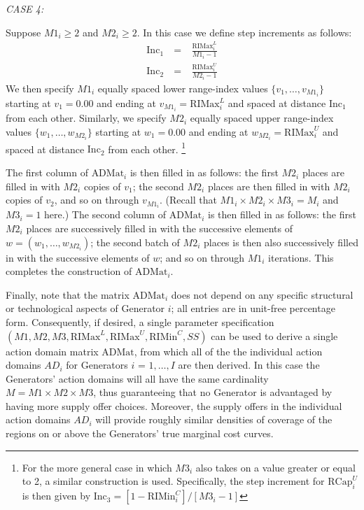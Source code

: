 \documentclass[12pt]{article}
\begin{document}
\vspace*{3mm}
\noindent
\textit{CASE 4:\/}

\nopagebreak
Suppose $M1_i \ge 2$ and $M2_i \ge 2$.  In this case we define step increments as follows:
           \begin{eqnarray} \label{StepInc}
        \mbox{Inc}_1 ~ &= &~  \frac{\mbox{RIMax}^L_i}{M1_i - 1} \\
        \mbox{Inc}_2 ~ &= & ~  \frac{\mbox{RIMax}^U_i}{M2_i - 1} 
                 \end{eqnarray}
We then specify $M1_i$ equally spaced lower range-index values $\{v_1,\ldots ,v_{M1_i}\}$ starting at $v_1 = 0.00$ and 
ending at $v_{M1_i} =\mbox{RIMax}^L_i$ and spaced at distance $\mbox{Inc}_1$ from each other.  Similarly, 
we specify $M2_i$ equally spaced upper range-index values  $\{w_1,\ldots ,w_{M2_i}\}$ starting at $w_1 = 0.00$ and 
ending at $w_{M2_i} =\mbox{RIMax}^U_i$ and spaced at distance $\mbox{Inc}_2$ from each other.%
	\footnote{For the more general case in which $M3_i$ also takes on a value greater or equal to 2, a similar construction is used.  Specifically, the step increment for $\mbox{RCap}_i^U$ is then given by $\mbox{Inc}_3 = [1 - \mbox{RIMin}_i^C]/[M3_i - 1]$} 

The first column of $\mbox{ADMat}_i$ is then filled in as follows:  the first $M2_i$ places are filled in with $M2_i$ copies of $v_1$; the second $M2_i$ places are then filled in with $M2_i$ copies of $v_2$, and so on through $v_{M1_i}$.  (Recall that $M1_i\times M2_i \times M3_i= M_i$ and $M3_i = 1$ here.) The second column of $\mbox{ADMat}_i$ is then filled in as follows:  the first $M2_i$ places are successively filled in with the successive elements of 
$w = (w_1,\dots,w_{M2_i})$; 
the second batch of $M2_i$ places is then also successively filled in with the successive elements of $w$; and so on through $M1_i$ iterations.  This completes the construction of $\mbox{ADMat}_i$.

Finally, note that the matrix $\mbox{ADMat}_i$ does not depend on any specific structural or technological aspects of 
Generator $i$; all entries are in unit-free percentage form. Consequently, if desired, a single parameter 
specification $(M1,M2,M3,\mbox{RIMax}^L,\mbox{RIMax}^U,\mbox{RIMin}^C,SS)$ can be used to derive a single action domain matrix $\mbox{ADMat}$, from which all of the the individual action domains $AD_i$ for Generators $i$ = $1,\ldots,I$ are then derived.  
In this case the Generators' action domains will all have the same cardinality $M = M1\times M2\times M3$, thus guaranteeing that no Generator is advantaged by having more supply offer choices.  Moreover, the supply offers in the individual action domains $AD_i$ will provide roughly similar densities of coverage of the regions on or above the Generators' true marginal cost curves.  
\end{document}
